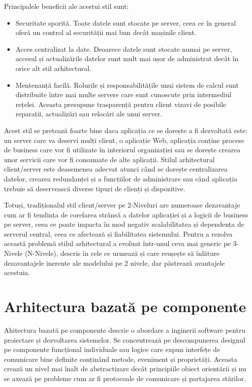 \documentclass[12pt, a4paper, oneside, romanian]{teza-upb}
\begin{document}
Principalele beneficii ale acestui stil sunt:
\begin{itemize}
	\item Securitate sporită. Toate datele sunt stocate pe server, ceea ce în general oferă un control al securității mai bun decât mașinile client.
	\item Acces centralizat la date. Deoarece datele sunt stocate numai pe server, accesul și actualizările datelor sunt mult mai ușor de administrat decât în orice alt stil arhitectural.
	\item Mentenanță facilă. Rolurile și responsabilitățile unui sistem de calcul sunt distribuite între mai multe servere care sunt cunoscute prin intermediul rețelei. Aceasta presupune trasparență pentru client vizavi de posibile reparații, actualizări sau relocări ale unui server.
\end{itemize}

Acest stil se pretează foarte bine daca aplicația ce se dorește a fi dezvoltată este: un server care va deservi mulți client, o aplicație Web, aplicația conține procese de business care vor fi utilizate în interiorul organizației sau se dorește crearea unor servicii care vor fi consumate de alte aplicații. Stilul arhitectural client/server este deasemenea adecvat atunci când se dorește centralizarea datelor, crearea redundanței și a funcțiilor de administrare sau când aplicația trebuie să deservească diverse tipuri de clienți și dispozitive. 

Totuși, tradiționalul stil client/server pe 2-Niveluri are numeroase dezavantaje cum ar fi tendința de corelarea strânsă a datelor aplicației și a logicii de business pe server, ceea ce poate impacta în mod negativ scalabilitatea și dependența de serverul central, ceea ce afectează și fiabilitatea sistemului. Pentru a rezolva această problemă stilul arhitectural a evoluat într-unul ceva mai generic pe 3-Nivele (N-Nivele), descris în cele ce urmează și care reușește să înlăture dezavantajele inerente ale modelului pe 2 nivele, dar păstrează avantajele acestuia.

\section{Arhitectura bazată pe componente}
Ahitectura bazată pe componente descrie o abordare a inginerii software pentru proiectare și dezvoltarea sistemelor. Se concentrează pe descompunerea designul pe componente funcțional individuale sau logice care expun interfețe de comunicare bine definite conținând metode, eveniment și proprietăți. Aceasta crează un nivel mai înalt de abstractizare decât principiile obiect orientării și nu se axează pe probleme cum ar fi protocoale de comunicare și partajarea stărilor.
\end{document}
